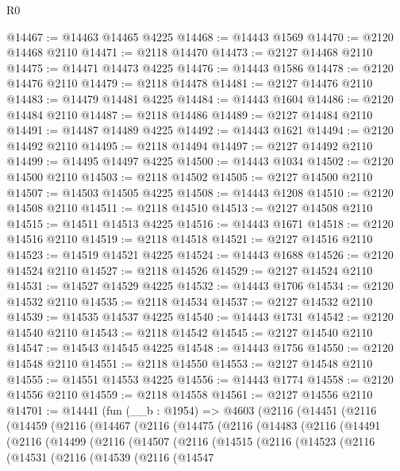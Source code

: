 \begin{lexlean}{R0}
\begin{coremodule}
@14467 := @14463 @14465 @4225
@14468 := @14443 @1569
@14470 := @2120 @14468 @2110
@14471 := @2118 @14470
@14473 := @2127 @14468 @2110
@14475 := @14471 @14473 @4225
@14476 := @14443 @1586
@14478 := @2120 @14476 @2110
@14479 := @2118 @14478
@14481 := @2127 @14476 @2110
@14483 := @14479 @14481 @4225
@14484 := @14443 @1604
@14486 := @2120 @14484 @2110
@14487 := @2118 @14486
@14489 := @2127 @14484 @2110
@14491 := @14487 @14489 @4225
@14492 := @14443 @1621
@14494 := @2120 @14492 @2110
@14495 := @2118 @14494
@14497 := @2127 @14492 @2110
@14499 := @14495 @14497 @4225
@14500 := @14443 @1034
@14502 := @2120 @14500 @2110
@14503 := @2118 @14502
@14505 := @2127 @14500 @2110
@14507 := @14503 @14505 @4225
@14508 := @14443 @1208
@14510 := @2120 @14508 @2110
@14511 := @2118 @14510
@14513 := @2127 @14508 @2110
@14515 := @14511 @14513 @4225
@14516 := @14443 @1671
@14518 := @2120 @14516 @2110
@14519 := @2118 @14518
@14521 := @2127 @14516 @2110
@14523 := @14519 @14521 @4225
@14524 := @14443 @1688
@14526 := @2120 @14524 @2110
@14527 := @2118 @14526
@14529 := @2127 @14524 @2110
@14531 := @14527 @14529 @4225
@14532 := @14443 @1706
@14534 := @2120 @14532 @2110
@14535 := @2118 @14534
@14537 := @2127 @14532 @2110
@14539 := @14535 @14537 @4225
@14540 := @14443 @1731
@14542 := @2120 @14540 @2110
@14543 := @2118 @14542
@14545 := @2127 @14540 @2110
@14547 := @14543 @14545 @4225
@14548 := @14443 @1756
@14550 := @2120 @14548 @2110
@14551 := @2118 @14550
@14553 := @2127 @14548 @2110
@14555 := @14551 @14553 @4225
@14556 := @14443 @1774
@14558 := @2120 @14556 @2110
@14559 := @2118 @14558
@14561 := @2127 @14556 @2110
@14701 := @14441
    (fun (__b : @1954) =>
    @4603
      (@2116
        (@14451
          (@2116
            (@14459
              (@2116
                (@14467
                  (@2116
                    (@14475
                      (@2116
                        (@14483
                          (@2116
                            (@14491
                              (@2116
                                (@14499
                                  (@2116
                                    (@14507
                                      (@2116
                                        (@14515
                                          (@2116
                                            (@14523
                                              (@2116
                                                (@14531
                                                  (@2116
                                                    (@14539
                                                      (@2116
                                                        (@14547

\end{coremodule}
\end{lexlean}
